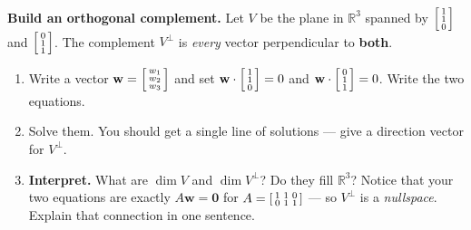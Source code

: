 \documentclass[10pt]{article}
\newcommand{\ww}{\mathbf{w}}
\newcommand{\zero}{\mathbf{0}}
\begin{document}
\begin{tcolorbox}[colback=white, colframe=black!40, title=\textbf{Tier E --- Extension},
    fonttitle=\bfseries, arc=1.5mm, left=3mm, right=3mm, top=2mm, bottom=2mm, breakable]
\textbf{Build an orthogonal complement.} Let $V$ be the plane in $\mathbb{R}^3$ spanned by
$\begin{bsmallmatrix} 1\\1\\0 \end{bsmallmatrix}$ and $\begin{bsmallmatrix} 0\\1\\1 \end{bsmallmatrix}$.
The complement $V^{\perp}$ is \emph{every} vector perpendicular to \textbf{both}.
\begin{enumerate}[leftmargin=1.7em, itemsep=9pt]
  \item Write a vector $\ww=\begin{bsmallmatrix} w_1\\w_2\\w_3 \end{bsmallmatrix}$ and set
        $\ww\cdot\begin{bsmallmatrix} 1\\1\\0 \end{bsmallmatrix}=0$ and
        $\ww\cdot\begin{bsmallmatrix} 0\\1\\1 \end{bsmallmatrix}=0$. Write the two equations. 
  \item Solve them. You should get a single line of solutions --- give a direction vector for $V^{\perp}$.
  \item \textbf{Interpret.} What are $\dim V$ and $\dim V^{\perp}$? Do they fill $\mathbb{R}^3$? Notice that
        your two equations are exactly $A\ww=\zero$ for $A=\begin{bsmallmatrix} 1&1&0\\0&1&1 \end{bsmallmatrix}$
        --- so $V^{\perp}$ is a \emph{nullspace}. Explain that connection in one sentence. 
\end{enumerate}
\end{tcolorbox}
\end{document}
